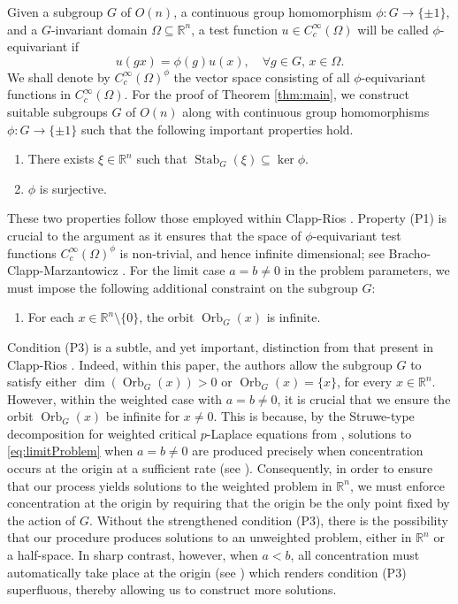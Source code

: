 \documentclass[10pt, reqno]{amsart}
\newcommand{\RR}{\mathbb{R}}
\newcommand{\Om}{\Omega}
\numberwithin{equation}{section}
\theoremstyle{definition}
\theoremstyle{remark}
\theoremstyle{plain}
\begin{document}
	Given a subgroup $G$ of $O(n)$, a continuous group homomorphism $\phi : G \to \{\pm 1\}$, and a $G$-invariant domain $\Om \subseteq \RR^n$, a test function $u \in C_c^\infty(\Om)$ will be called $\phi$-equivariant if
	\[
	u(gx) = \phi(g)u(x), \quad \forall g\in G,\, x \in \Om.
	\]
	We shall denote by $C_c^\infty(\Om)^\phi$ the vector space consisting of all $\phi$-equivariant functions in $C_c^\infty(\Om)$. For the proof of Theorem \ref{thm:main}, we construct suitable subgroups $G$ of $O(n)$ along with continuous group homomorphisms $\phi : G \to \{\pm 1\}$ such that the following important properties hold.
	\begin{enumerate}
		\item[(P1)]\label{P1} There exists $\xi \in \RR^n$ such that $\operatorname{Stab}_G(\xi) \subseteq \ker{\phi}$.
		\item[(P2)]\label{P2} $\phi$ is surjective.
	\end{enumerate}
	These two properties follow those employed within Clapp-Rios \cite{clappRios}. Property (P1) is crucial to the argument as it ensures that the space of $\phi$-equivariant test functions $C_c^\infty(\Om)^\phi$ is non-trivial, and hence infinite dimensional; see Bracho-Clapp-Marzantowicz \cite[page 195]{bracho2005symmetry}. For the limit case $a=b \ne 0$ in the problem parameters, we must impose the following additional constraint on the subgroup $G$:
	\begin{enumerate}
		\item[(P3)] For each $x \in \RR^n \setminus \{0\}$, the orbit $\operatorname{Orb}_G(x)$ is infinite.
	\end{enumerate}
	Condition (P3) is a subtle, and yet important, distinction from that present in Clapp-Rios \cite{clappRios}. Indeed, within this paper, the authors allow the subgroup $G$ to satisfy either $\dim(\operatorname{Orb}_G(x)) > 0$ or $\operatorname{Orb}_G(x) = \{x\}$, for every $x \in \RR^n$. However, within the weighted case with $a=b \ne 0$, it is crucial that we ensure the orbit $\operatorname{Orb}_G(x)$ be infinite for $x \ne 0$. This is because, by the Struwe-type decomposition for weighted critical $p$-Laplace equations from \cite{Chernysh}, solutions to \eqref{eq:limitProblem} when $a=b \ne 0$ are produced precisely when concentration occurs at the origin at a sufficient rate (see \cite[Theorem 2]{Chernysh}). Consequently, in order to ensure that our process yields solutions to the weighted problem in $\RR^n$, we must enforce concentration at the origin by requiring that the origin be the only point fixed by the action of $G$. Without the strengthened condition (P3), there is the possibility that our procedure produces solutions to an unweighted problem, either in $\RR^n$ or a half-space.  In sharp contrast, however, when $a < b$, all concentration must automatically take place at the origin (see \cite[Theorem 1]{Chernysh}) which renders condition (P3) superfluous, thereby allowing us to construct more solutions.
	
\end{document}
